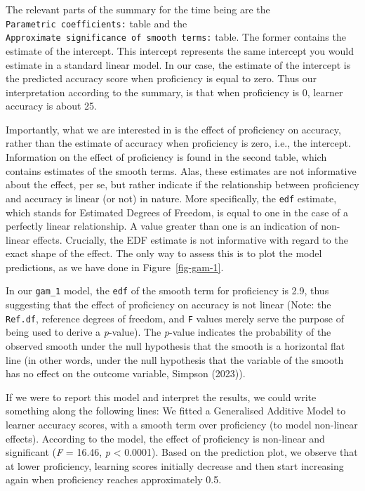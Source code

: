 \documentclass[
  letterpaper,
  DIV=11,
  numbers=noendperiod]{scrartcl}
\begin{document}
The relevant parts of the summary for the time being are the
\texttt{Parametric\ coefficients:} table and the
\texttt{Approximate\ significance\ of\ smooth\ terms:} table. The former
contains the estimate of the intercept. This intercept represents the
same intercept you would estimate in a standard linear model. In our
case, the estimate of the intercept is the predicted accuracy score when
proficiency is equal to zero. Thus our interpretation according to the
summary, is that when proficiency is 0, learner accuracy is about 25.

Importantly, what we are interested in is the effect of proficiency on
accuracy, rather than the estimate of accuracy when proficiency is zero,
i.e., the intercept. Information on the effect of proficiency is found
in the second table, which contains estimates of the smooth terms. Alas,
these estimates are not informative about the effect, per se, but rather
indicate if the relationship between proficiency and accuracy is linear
(or not) in nature. More specifically, the \texttt{edf} estimate, which
stands for Estimated Degrees of Freedom, is equal to one in the case of
a perfectly linear relationship. A value greater than one is an
indication of non-linear effects. Crucially, the EDF estimate is not
informative with regard to the exact shape of the effect. The only way
to assess this is to plot the model predictions, as we have done in
Figure~\ref{fig-gam-1}.

In our \texttt{gam\_1} model, the \texttt{edf} of the smooth term for
proficiency is 2.9, thus suggesting that the effect of proficiency on
accuracy is not linear (Note: the \texttt{Ref.df}, reference degrees of
freedom, and \texttt{F} values merely serve the purpose of being used to
derive a \emph{p}-value). The \emph{p}-value indicates the probability
of the observed smooth under the null hypothesis that the smooth is a
horizontal flat line (in other words, under the null hypothesis that the
variable of the smooth has no effect on the outcome variable, Simpson
(2023)).

If we were to report this model and interpret the results, we could
write something along the following lines: We fitted a Generalised
Additive Model to learner accuracy scores, with a smooth term over
proficiency (to model non-linear effects). According to the model, the
effect of proficiency is non-linear and significant (\emph{F} = 16.46,
\emph{p} \textless{} 0.0001). Based on the prediction plot, we observe
that at lower proficiency, learning scores initially decrease and then
start increasing again when proficiency reaches approximately 0.5.
\end{document}
